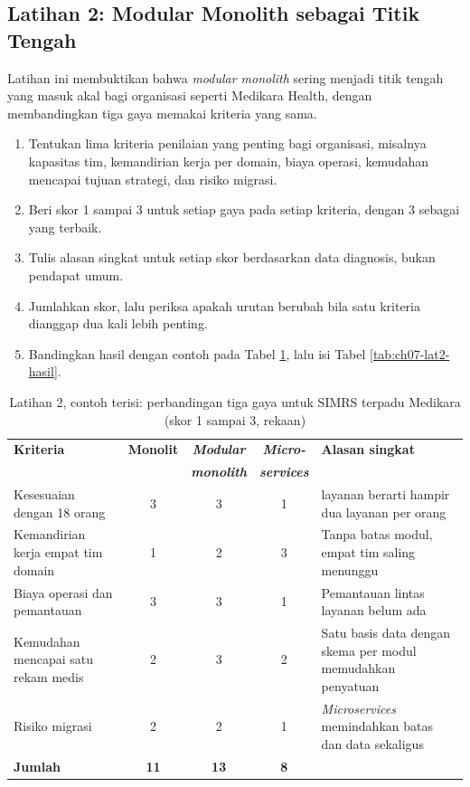 \subsection*{Latihan 2: Modular Monolith sebagai Titik Tengah}

Latihan ini membuktikan bahwa \textit{modular monolith} sering menjadi titik tengah yang masuk
akal bagi organisasi seperti Medikara Health, dengan membandingkan tiga gaya memakai kriteria yang
sama.

\begin{enumerate}
  \item Tentukan lima kriteria penilaian yang penting bagi organisasi, misalnya kapasitas tim,
        kemandirian kerja per domain, biaya operasi, kemudahan mencapai tujuan strategi, dan
        risiko migrasi.
  \item Beri skor 1 sampai 3 untuk setiap gaya pada setiap kriteria, dengan 3 sebagai yang terbaik.
  \item Tulis alasan singkat untuk setiap skor berdasarkan data diagnosis, bukan pendapat umum.
  \item Jumlahkan skor, lalu periksa apakah urutan berubah bila satu kriteria dianggap dua kali
        lebih penting.
  \item Bandingkan hasil dengan contoh pada Tabel \ref{tab:ch07-lat2-contoh}, lalu isi Tabel
        \ref{tab:ch07-lat2-hasil}.
\end{enumerate}

\begin{table}[!htb]
  \centering
  \caption{Latihan 2, contoh terisi: perbandingan tiga gaya untuk SIMRS terpadu Medikara (skor 1
           sampai 3, rekaan)}
  \label{tab:ch07-lat2-contoh}
  \footnotesize
  \begin{tabularx}{\textwidth}{>{\raggedright\arraybackslash}p{2.8cm} c c c >{\raggedright\arraybackslash}X}
    \hline
    \textbf{Kriteria} & \textbf{Monolit} & \textbf{\textit{Modular}} & \textbf{\textit{Micro-}} &
      \textbf{Alasan singkat} \\
    & & \textbf{\textit{monolith}} & \textbf{\textit{services}} & \\ \hline
    Kesesuaian dengan 18 orang & 3 & 3 & 1 & 32 layanan berarti hampir dua layanan per orang \\
      \hline
    Kemandirian kerja empat tim domain & 1 & 2 & 3 & Tanpa batas modul, empat tim saling menunggu
      \\ \hline
    Biaya operasi dan pemantauan & 3 & 3 & 1 & Pemantauan lintas layanan belum ada \\ \hline
    Kemudahan mencapai satu rekam medis & 2 & 3 & 2 & Satu basis data dengan skema per modul
      memudahkan penyatuan \\ \hline
    Risiko migrasi & 2 & 2 & 1 & \textit{Microservices} memindahkan batas dan data sekaligus \\
      \hline
    \textbf{Jumlah} & \textbf{11} & \textbf{13} & \textbf{8} & \\ \hline
  \end{tabularx}
\end{table}

